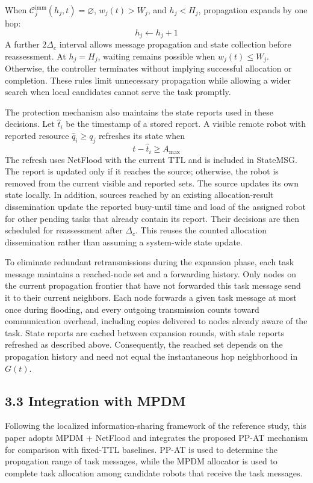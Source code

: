 \documentclass[type=submission,name=IR]{oae}
\begin{document}
When $\mathcal{C}^{\mathrm{imm}}_j(h_j,t)=\varnothing$, $w_j(t)>W_j$, and $h_j<H_j$, propagation expands by one hop:
\begin{equation}
h_j\leftarrow h_j+1
\label{eq:ttl_expansion}
\end{equation}
A further $2\Delta_c$ interval allows message propagation and state collection before reassessment. At $h_j=H_j$, waiting remains possible when $w_j(t)\leq W_j$. Otherwise, the controller terminates without implying successful allocation or completion. These rules limit unnecessary propagation while allowing a wider search when local candidates cannot serve the task promptly.

The protection mechanism also maintains the state reports used in these decisions. Let $\widehat t_i$ be the timestamp of a stored report. A visible remote robot with reported resource $\widehat q_i\geq q_j$ refreshes its state when
\begin{equation}
t-\widehat t_i\geq A_{\max}
\label{eq:report_age}
\end{equation}
The refresh uses NetFlood with the current TTL and is included in StateMSG. The report is updated only if it reaches the source; otherwise, the robot is removed from the current visible and reported sets. The source updates its own state locally. In addition, sources reached by an existing allocation-result dissemination update the reported busy-until time and load of the assigned robot for other pending tasks that already contain its report. Their decisions are then scheduled for reassessment after $\Delta_c$. This reuses the counted allocation dissemination rather than assuming a system-wide state update.

To eliminate redundant retransmissions during the expansion phase, each task message maintains a reached-node set and a forwarding history. Only nodes on the current propagation frontier that have not forwarded this task message send it to their current neighbors. Each node forwards a given task message at most once during flooding, and every outgoing transmission counts toward communication overhead, including copies delivered to nodes already aware of the task. State reports are cached between expansion rounds, with stale reports refreshed as described above. Consequently, the reached set depends on the propagation history and need not equal the instantaneous hop neighborhood in $G(t)$.

\subsection{3.3 Integration with MPDM}
Following the localized information-sharing framework of the reference study, this paper adopts MPDM + NetFlood and integrates the proposed PP-AT mechanism for comparison with fixed-TTL baselines. PP-AT is used to determine the propagation range of task messages, while the MPDM allocator is used to complete task allocation among candidate robots that receive the task messages.
\end{document}
